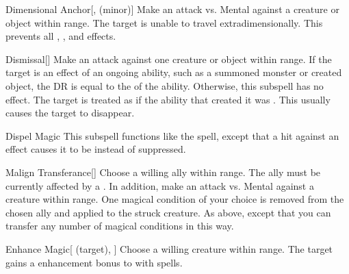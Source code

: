 \begin{ability}[\nth{2}]{Dimensional Anchor}[,  (minor)]
Make an attack vs. Mental against a creature or object within \rngmed range.
\hit The target is unable to travel extradimensionally.
This prevents all , , and  effects.
\end{ability}
\vspace{0.25em}


\begin{ability}[\nth{2}]{Dismissal}[]
Make an attack against one creature or object within \rngmed range.
If the target is an effect of an ongoing  ability, such as a summoned monster or created object, the DR is equal to the  of the ability.
Otherwise, this subspell has no effect.
\hit The target is treated as if the ability that created it was .
This usually causes the target to disappear.
\end{ability}
\vspace{0.25em}


\begin{ability}[\nth{2}]{Dispel Magic}
This subspell functions like the  spell, except that a hit against an effect causes it to be  instead of suppressed.
\end{ability}
\vspace{0.25em}


\begin{ability}[\nth{2}]{Malign Transferance}[]
Choose a willing ally within \rngmed range.
The ally must be currently affected by a  .
In addition, make an attack vs. Mental against a creature within \rngmed range.
\hit One magical condition of your choice is removed from the chosen ally and applied to the struck creature.
\crit As above, except that you can transfer any number of magical conditions in this way.
\end{ability}
\vspace{0.25em}


\begin{ability}[\nth{3}]{Enhance Magic}[ (target), ]
Choose a willing creature within \rngmed range.
The target gains a  enhancement bonus to  with spells.
\end{ability}
\vspace{0.25em}


